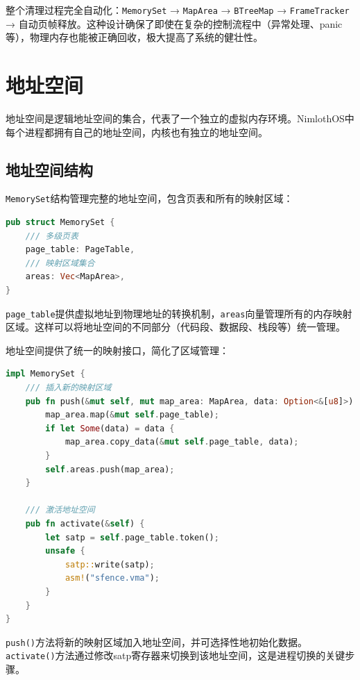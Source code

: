 整个清理过程完全自动化：\lstinline[language=Rust]{MemorySet} → \lstinline[language=Rust]{MapArea} → \lstinline[language=Rust]{BTreeMap} → \lstinline[language=Rust]{FrameTracker} → 自动页帧释放。这种设计确保了即使在复杂的控制流程中（异常处理、panic等），物理内存也能被正确回收，极大提高了系统的健壮性。

\section{地址空间}

地址空间是逻辑地址空间的集合，代表了一个独立的虚拟内存环境。NimlothOS中每个进程都拥有自己的地址空间，内核也有独立的地址空间。

\subsection{地址空间结构}

\lstinline[language=Rust]{MemorySet}结构管理完整的地址空间，包含页表和所有的映射区域：

\begin{lstlisting}[language=Rust,caption={地址空间结构}, label={lst:memory-set}]
pub struct MemorySet {
    /// 多级页表
    page_table: PageTable,
    /// 映射区域集合
    areas: Vec<MapArea>,
}
\end{lstlisting}

\lstinline[language=Rust]{page_table}提供虚拟地址到物理地址的转换机制，\lstinline[language=Rust]{areas}向量管理所有的内存映射区域。这样可以将地址空间的不同部分（代码段、数据段、栈段等）统一管理。

地址空间提供了统一的映射接口，简化了区域管理：

\begin{lstlisting}[language=Rust,caption={地址空间映射操作}, label={lst:memory-set-ops}]
impl MemorySet {
    /// 插入新的映射区域
    pub fn push(&mut self, mut map_area: MapArea, data: Option<&[u8]>) {
        map_area.map(&mut self.page_table);
        if let Some(data) = data {
            map_area.copy_data(&mut self.page_table, data);
        }
        self.areas.push(map_area);
    }
    
    /// 激活地址空间
    pub fn activate(&self) {
        let satp = self.page_table.token();
        unsafe {
            satp::write(satp);
            asm!("sfence.vma");
        }
    }
}
\end{lstlisting}

\lstinline[language=Rust]{push()}方法将新的映射区域加入地址空间，并可选择性地初始化数据。\lstinline[language=Rust]{activate()}方法通过修改satp寄存器来切换到该地址空间，这是进程切换的关键步骤。

